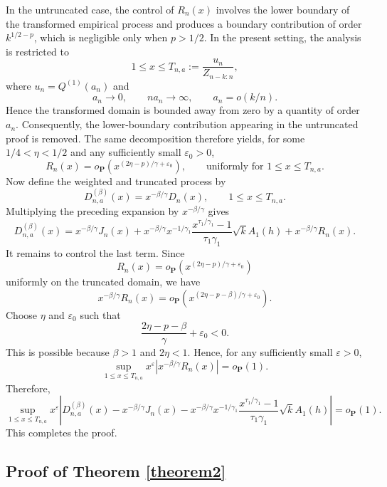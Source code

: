 \documentclass[reqno,openbib,runningheads,a4paper,12pt]{amsart}%
\begin{document}
\noindent In the untruncated case, the control of $R_{n}(x)$ involves the
lower boundary of the transformed empirical process and produces a boundary
contribution of order $k^{1/2-p}$, which is negligible only when $p>1/2$. In
the present setting, the analysis is restricted to
\[
1\leq x\leq T_{n,a}:=\frac{u_{n}}{Z_{n-k:n}},
\]
where $u_{n}=Q^{(1)}(a_{n})$ and
\[
a_{n}\rightarrow0,\qquad na_{n}\rightarrow\infty,\qquad a_{n}=o(k/n).
\]
Hence the transformed domain is bounded away from zero by a quantity of order
$a_{n}$. Consequently, the lower-boundary contribution appearing in the
untruncated proof is removed. The same decomposition therefore yields, for
some $1/4<\eta<1/2$ and any sufficiently small $\varepsilon_{0}>0$,
\[
R_{n}(x)=o_{\mathbf{P}}\!\left(  x^{(2\eta-p)/\gamma+\varepsilon_{0}}\right)
,\qquad\text{uniformly for }1\leq x\leq T_{n,a}.
\]
Now define the weighted and truncated process by
\[
D_{n,a}^{(\beta)}(x)=x^{-\beta/\gamma}D_{n}(x),\qquad1\leq x\leq T_{n,a}.
\]
Multiplying the preceding expansion by $x^{-\beta/\gamma}$ gives
\[
D_{n,a}^{(\beta)}(x)=x^{-\beta/\gamma}J_{n}(x)+x^{-\beta/\gamma}%
x^{-1/\gamma_{1}}\frac{x^{\tau_{1}/\gamma_{1}}-1}{\tau_{1}\gamma_{1}}\sqrt
{k}A_{1}(h)+x^{-\beta/\gamma}R_{n}(x).
\]
It remains to control the last term. Since
\[
R_{n}(x)=o_{\mathbf{P}}\!\left(  x^{(2\eta-p)/\gamma+\varepsilon_{0}}\right)
\]
uniformly on the truncated domain, we have
\[
x^{-\beta/\gamma}R_{n}(x)=o_{\mathbf{P}}\!\left(  x^{(2\eta-p-\beta
)/\gamma+\varepsilon_{0}}\right)  .
\]
Choose $\eta$ and $\varepsilon_{0}$ such that
\[
\frac{2\eta-p-\beta}{\gamma}+\varepsilon_{0}<0.
\]
This is possible because $\beta>1$ and $2\eta<1$. Hence, for any sufficiently
small $\varepsilon>0$,
\[
\sup_{1\leq x\leq T_{n,a}}x^{\varepsilon}\left\vert x^{-\beta/\gamma}%
R_{n}(x)\right\vert =o_{\mathbf{P}}(1).
\]
Therefore,
\[
\sup_{1\leq x\leq T_{n,a}}x^{\varepsilon}\left\vert D_{n,a}^{(\beta
)}(x)-x^{-\beta/\gamma}J_{n}(x)-x^{-\beta/\gamma}x^{-1/\gamma_{1}}%
\frac{x^{\tau_{1}/\gamma_{1}}-1}{\tau_{1}\gamma_{1}}\sqrt{k}A_{1}%
(h)\right\vert =o_{\mathbf{P}}(1).
\]
This completes the proof.

\subsection{Proof of Theorem \ref{theorem2}}
\end{document}
